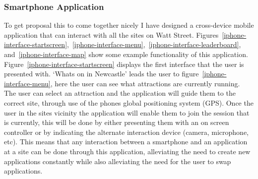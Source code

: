 \documentclass[a4paper,12pt]{article}
\begin{document}
\subsubsection{Smartphone Application}
To get proposal this to come together nicely I have designed a cross-device mobile application that can interact with all the sites on Watt Street.
Figures~\ref{iphone-interface-startscreen},~\ref{iphone-interface-menu},~\ref{iphone-interface-leaderboard}, and~\ref{iphone-interface-map} show some example functionality of this application.
Figure~\ref{iphone-interface-startscreen} displays the first interface that the user is presented with. `Whats on in Newcastle' leads the user to figure~\ref{iphone-interface-menu}, here the user can see what attractions are currently running. 
The user can select an attraction and the application will guide them to the correct site, through use of the phones global positioning system (GPS).
Once the user in the sites vicinity the application will enable them to join the session that is currently, this will be done by either presenting them with an on screen controller or by indicating the alternate interaction device (camera, microphone, etc). 
This means that any interaction between a smartphone and an application at a site can be done through this application, alleviating the need to create new applications constantly while also alleviating the need for the user to swap applications.
\end{document}
